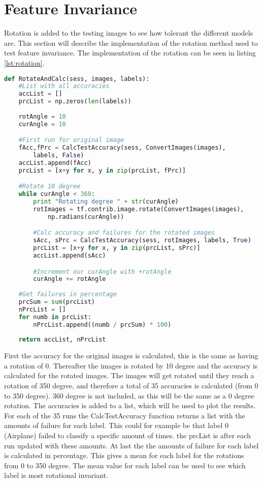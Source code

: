 \section{Feature Invariance}

Rotation is added to the testing images to see how tolerant the different models are. This section will describe the implementation of the rotation method used to test feature invariance. The implementation of the rotation can be seen in listing \ref{lst:rotation}.

\begin{lstlisting}[language=Python, label=lst:rotation, caption=Rotate the images and calculate the accuracy]
def RotateAndCalc(sess, images, labels):
    #List with all accuracies
    accList = []
    prcList = np.zeros(len(labels))
    
    rotAngle = 10
    curAngle = 10

    #First run for original image
    fAcc,fPrc = CalcTestAccuracy(sess, ConvertImages(images),
	 	labels, False)
    accList.append(fAcc)
    prcList = [x+y for x, y in zip(prcList, fPrc)]

    #Rotate 10 degree
    while curAngle < 360:
        print "Rotating degree " + str(curAngle)
        rotImages = tf.contrib.image.rotate(ConvertImages(images), 
			np.radians(curAngle))

        #Calc accuracy and failures for the rotated images
        sAcc, sPrc = CalcTestAccuracy(sess, rotImages, labels, True)
        prcList = [x+y for x, y in zip(prcList, sPrc)]
        accList.append(sAcc)

        #Increment our curAngle with +rotAngle
        curAngle += rotAngle
       
    #Get failures in percentage
    prcSum = sum(prcList)
    nPrcList = []
    for numb in prcList:
        nPrcList.append((numb / prcSum) * 100)
    
    return accList, nPrcList
\end{lstlisting}

First the accuracy for the original images is calculated, this is the same as having a rotation of 0. Thereafter the images is rotated by 10 degree and the accuracy is calculated for the rotated images. The images will get rotated until they reach a rotation of 350 degree, and therefore a total of 35 accuracies is calculated (from 0 to 350 degree). 360 degree is not included, as this will be the same as a 0 degree rotation. The accuracies is added to a list, which will be used to plot the results. For each of the 35 runs the CalcTestAccuracy function returns a list with the amounts of failure for each label. This could for example be that label 0 (Airplane) failed to classify a specific amount of times. the prcList is after each run updated with these amounts. At last the the amounts of failure for each label is calculated in percentage. This gives a mean for each label for the rotations from 0 to 350 degree. The mean value for each label can be used to see which label is most rotational invariant.
\newline

